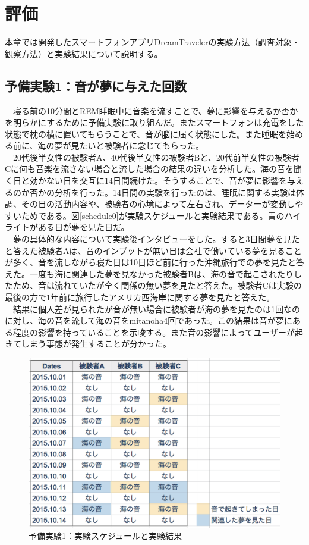 \chapter{評価}
\label{chap:ledoxea}
本章では開発したスマートフォンアプリDreamTravelerの実験方法（調査対象・観察方法）と実験結果について説明する。

\section{予備実験1：音が夢に与えた回数}
　寝る前の10分間とREM睡眠中に音楽を流すことで、夢に影響を与えるか否かを明らかにするために予備実験に取り組んだ。またスマートフォンは充電をした状態で枕の横に置いてもらうことで、音が脳に届く状態にした。また睡眠を始める前に、海の夢が見たいと被験者に念じてもらった。\\
　20代後半女性の被験者A、40代後半女性の被験者Bと、20代前半女性の被験者Cに何も音楽を流さない場合と流した場合の結果の違いを分析した。海の音を聞く日と効かない日を交互に14日間続けた。そうすることで、音が夢に影響を与えるのか否かの分析を行った。14日間の実験を行ったのは、睡眠に関する実験は体調、その日の活動内容や、被験者の心境によって左右され、データーが変動しやすいためである。図\ref{schedule0}が実験スケジュールと実験結果である。青のハイライトがある日が夢を見た日だ。\\
　夢の具体的な内容について実験後インタビューをした。すると3日間夢を見たと答えた被験者Aは、音のインプットが無い日は会社で働いている夢を見ることが多く、音を流しながら寝た日は10日ほど前に行った沖縄旅行での夢を見たと答えた。一度も海に関連した夢を見なかった被験者Bは、海の音で起こされたりしたため、音は流れていたが全く関係の無い夢を見たと答えた。被験者Cは実験の最後の方で1年前に旅行したアメリカ西海岸に関する夢を見たと答えた。\\
　結果に個人差が見られたが音が無い場合に被験者が海の夢を見たのは1回なのに対し、海の音を流して海の音をmitanoha4回であった。この結果は音が夢にある程度の影響を持っていることを示唆する。また音の影響によってユーザーが起きてしまう事態が発生することが分かった。

\begin{figure}[htbp]
\begin{center}
\includegraphics[width=13cm]{eps/schedule0.eps}
\caption{予備実験1：実験スケジュールと実験結果}
\label{schedule}
\end{center}
\end{figure}

